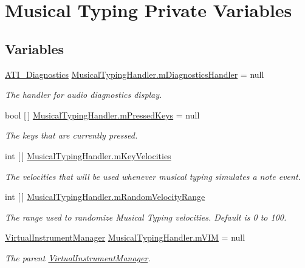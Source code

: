\hypertarget{group___mus_typ_priv_var}{}\section{Musical Typing Private Variables}
\label{group___mus_typ_priv_var}
\subsection*{Variables}
\begin{DoxyCompactItemize}
\item 
\hyperlink{group___audio_testing_class_a_t_i___diagnostics}{A\+T\+I\+\_\+\+Diagnostics} \hyperlink{group___mus_typ_priv_var_gaaeabcb1c6445b0ff93059036cc4ec1f4}{Musical\+Typing\+Handler.\+m\+Diagnostics\+Handler} = null
\begin{DoxyCompactList}\small\item\em The handler for audio diagnostics display. \end{DoxyCompactList}\item 
bool \mbox{[}$\,$\mbox{]} \hyperlink{group___mus_typ_priv_var_gaede8bc4123f7bfe514816593fdfbec67}{Musical\+Typing\+Handler.\+m\+Pressed\+Keys} = null
\begin{DoxyCompactList}\small\item\em The keys that are currently pressed. \end{DoxyCompactList}\item 
int \mbox{[}$\,$\mbox{]} \hyperlink{group___mus_typ_priv_var_ga4836c9fe1805279497f421a29879bf5a}{Musical\+Typing\+Handler.\+m\+Key\+Velocities}
\begin{DoxyCompactList}\small\item\em The velocities that will be used whenever musical typing simulates a note event. \end{DoxyCompactList}\item 
int \mbox{[}$\,$\mbox{]} \hyperlink{group___mus_typ_priv_var_ga15df83911d88e77e46726ff5642d04e6}{Musical\+Typing\+Handler.\+m\+Random\+Velocity\+Range}
\begin{DoxyCompactList}\small\item\em The range used to randomize Musical Typing velocities. Default is 0 to 100. \end{DoxyCompactList}\item 
\hyperlink{class_virtual_instrument_manager}{Virtual\+Instrument\+Manager} \hyperlink{group___mus_typ_priv_var_ga63b2c5e1f9b1320a6b435a9018759444}{Musical\+Typing\+Handler.\+m\+V\+IM} = null
\begin{DoxyCompactList}\small\item\em The parent \hyperlink{class_virtual_instrument_manager}{Virtual\+Instrument\+Manager}. \end{DoxyCompactList}\end{DoxyCompactItemize}


